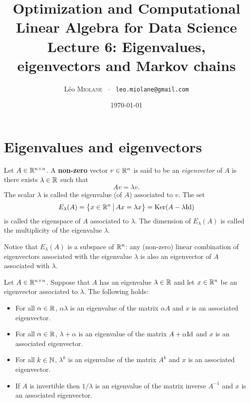 \documentclass[11pt,nocut]{article}
\title{\vspace{-2.0cm}%
	Optimization and Computational Linear Algebra for Data Science\\
Lecture 6: Eigenvalues, eigenvectors and Markov chains}
\author{Léo \textsc{Miolane} \ $\cdot$ \ \texttt{leo.miolane@gmail.com}}
\date{\today}
\begin{document}
\maketitle


\section{Eigenvalues and eigenvectors}

\begin{definition}
	Let $A \in \mathbb{R}^{n \times n}$. A \textbf{non-zero} vector $v \in \mathbb{R}^n$ is said to be an \emph{eigenvector} of $A$ is there exists $\lambda \in \mathbb{R}$ such that
	$$
	A v = \lambda v.
	$$
	The scalar $\lambda$ is called the eigenvalue (of $A$) associated to $v$. The set
	$$
	E_{\lambda}(A) = \big\{ x \in \mathbb{R}^n \, \big| \, Ax = \lambda x \big\} = {{\rm Ker}}(A-\lambda {{\rm Id}})
	$$
	is called the eigenspace of $A$ associated to $\lambda$. The dimension of $E_{\lambda}(A)$ is called the multiplicity of the eigenvalue $\lambda$.
\end{definition}

\begin{remark}
	Notice that $E_{\lambda}(A)$ is a subspace of $\mathbb{R}^n$: any (non-zero) linear combination of eigenvectors associated with the eigenvalue $\lambda$ is also an eigenvector of $A$ associated with $\lambda$.
\end{remark}

\begin{proposition}
	Let $A \in \mathbb{R}^{n \times n}$. 
	Suppose that $A$ has an eigenvalue $\lambda \in \mathbb{R}$ and let $x \in \mathbb{R}^n$ be an eigenvector associated to $\lambda$.
	The following holds:
	\begin{itemize}
		\item For all $\alpha \in \mathbb{R}$, $\alpha \lambda$ is an eigenvalue of the matrix $\alpha A$ and $x$ is an associated eigenvector.
		\item For all $\alpha \in \mathbb{R}$, $\lambda + \alpha$ is an eigenvalue of the matrix $A + \alpha {{\rm Id}}$ and $x$ is an associated eigenvector.
		\item For all $k \in \mathbb{N}$, $\lambda^k$ is an eigenvalue of the matrix $A^k$ and $x$ is an associated eigenvector.
		\item If $A$ is invertible then $1/\lambda$ is an eigenvalue of the matrix inverse $A^{-1}$ and $x$ is an associated eigenvector.
	\end{itemize}
\end{proposition}
\end{document}

